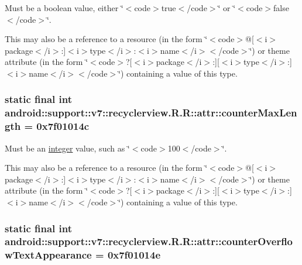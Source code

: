 Must be a boolean value, either \char`\"{}$<$code$>$true$<$/code$>$\char`\"{} or \char`\"{}$<$code$>$false$<$/code$>$\char`\"{}. 

This may also be a reference to a resource (in the form \char`\"{}$<$code$>$@\mbox{[}$<$i$>$package$<$/i$>$:\mbox{]}$<$i$>$type$<$/i$>$:$<$i$>$name$<$/i$>$$<$/code$>$\char`\"{}) or theme attribute (in the form \char`\"{}$<$code$>$?\mbox{[}$<$i$>$package$<$/i$>$:\mbox{]}\mbox{[}$<$i$>$type$<$/i$>$:\mbox{]}$<$i$>$name$<$/i$>$$<$/code$>$\char`\"{}) containing a value of this type. \hypertarget{classandroid_1_1support_1_1v7_1_1recyclerview_1_1_r_1_1attr_6035be94c4a7f9a62ed62e0bbba7b82b}{
\subsubsection[{counterMaxLength}]{\setlength{\rightskip}{0pt plus 5cm}static final int android::support::v7::recyclerview.R.R::attr::counterMaxLength = 0x7f01014c}}
\label{classandroid_1_1support_1_1v7_1_1recyclerview_1_1_r_1_1attr_6035be94c4a7f9a62ed62e0bbba7b82b}


Must be an \hyperlink{classandroid_1_1support_1_1v7_1_1recyclerview_1_1_r_1_1integer}{integer} value, such as \char`\"{}$<$code$>$100$<$/code$>$\char`\"{}. 

This may also be a reference to a resource (in the form \char`\"{}$<$code$>$@\mbox{[}$<$i$>$package$<$/i$>$:\mbox{]}$<$i$>$type$<$/i$>$:$<$i$>$name$<$/i$>$$<$/code$>$\char`\"{}) or theme attribute (in the form \char`\"{}$<$code$>$?\mbox{[}$<$i$>$package$<$/i$>$:\mbox{]}\mbox{[}$<$i$>$type$<$/i$>$:\mbox{]}$<$i$>$name$<$/i$>$$<$/code$>$\char`\"{}) containing a value of this type. \hypertarget{classandroid_1_1support_1_1v7_1_1recyclerview_1_1_r_1_1attr_3e5b4cf97068612b73cb5e5d1683fa83}{
\subsubsection[{counterOverflowTextAppearance}]{\setlength{\rightskip}{0pt plus 5cm}static final int android::support::v7::recyclerview.R.R::attr::counterOverflowTextAppearance = 0x7f01014e}}
\label{classandroid_1_1support_1_1v7_1_1recyclerview_1_1_r_1_1attr_3e5b4cf97068612b73cb5e5d1683fa83}


